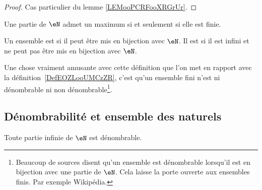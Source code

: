 \begin{proof}
	Cas particulier du lemme \ref{LEMooPCRFooXRGrUr}.
\end{proof}


\begin{lemma}       \label{LEMooGQUWooYJQfJB}
	Une partie de \( \eN\) admet un maximum si et seulement si elle est finie.
\end{lemma}


\begin{definition}\label{DefEnsembleDenombrable}
	Un ensemble est  si il peut être mis en bijection avec \( \eN\). Il est  si il est infini et ne peut pas être mis en bijection avec \( \eN\).
\end{definition}
Une chose vraiment amusante avec cette définition que l'on met en rapport avec la définition~\ref{DefEOZLooUMCzZR}, c'est qu'un ensemble fini n'est ni dénombrable ni non dénombrable\footnote{Beaucoup de sources disent qu'un ensemble est dénombrable lorsqu'il est en bijection avec une partie de \( \eN\). Cela laisse la porte ouverte aux ensembles finis. Par exemple Wikipédia\cite{ooLMVKooUiQUtb}.}.


\subsection{Dénombrabilité et ensemble des naturels}

\begin{proposition}      \label{PROPooOBKMooWEGCvM}
	Toute partie infinie de \( \eN\) est dénombrable.
\end{proposition}

